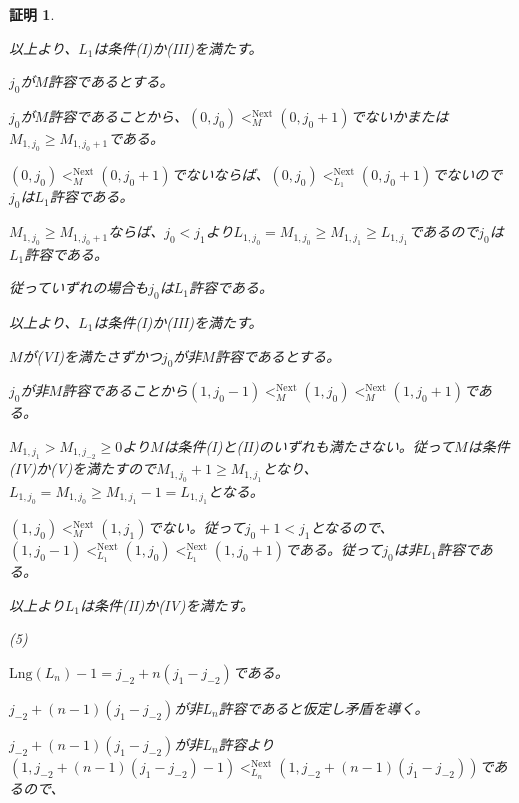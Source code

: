 \documentclass[dvipdfmx,uplatex]{jsarticle}
\theoremstyle{customnonumberbreakfortheorem}
\theoremstyle{customnonumberbreakforproof}
\newtheorem{hideableproof}{証明}
\newcommand{\qedhere}{\hfill\hideableproofSymbol}
\begin{document}
\begin{hideableproof}
\begin{indented}
\begin{indented}
			\item 以上より、\(L_1\)は条件(I)か(III)を満たす。
		\end{indented}
		\item \(j_0\)が\(M\)許容であるとする。
		\begin{indented}
			\item \(j_0\)が\(M\)許容であることから、\((0,j_0) <_M^{\textrm{Next}} (0,j_0+1)\)でないかまたは\(M_{1,j_0} \geq M_{1,j_0+1}\)である。
			\item \((0,j_0) <_M^{\textrm{Next}} (0,j_0+1)\)でないならば、\((0,j_0) <_{L_1}^{\textrm{Next}} (0,j_0+1)\)でないので\(j_0\)は\(L_1\)許容である。
			\item \(M_{1,j_0} \geq M_{1,j_0+1}\)ならば、\(j_0 < j_1\)より\(L_{1,j_0} = M_{1,j_0} \geq M_{1,j_1} \geq L_{1,j_1}\)であるので\(j_0\)は\(L_1\)許容である。
			\item 従っていずれの場合も\(j_0\)は\(L_1\)許容である。
			\item 以上より、\(L_1\)は条件(I)か(III)を満たす。
		\end{indented}
		\item \(M\)が(VI)を満たさずかつ\(j_0\)が非\(M\)許容であるとする。
		\begin{indented}
			\item \(j_0\)が非\(M\)許容であることから\((1,j_0-1) <_M^{\textrm{Next}} (1,j_0) <_M^{\textrm{Next}} (1,j_0+1)\)である。
			\item \(M_{1,j_1} > M_{1,j_{-2}} \geq 0\)より\(M\)は条件(I)と(II)のいずれも満たさない。従って\(M\)は条件(IV)か(V)を満たすので\(M_{1,j_0}+1 \geq M_{1,j_1}\)となり、\(L_{1,j_0} = M_{1,j_0} \geq M_{1,j_1}-1 = L_{1,j_1}\)となる。
			\item \((1,j_0) <_M^{\textrm{Next}} (1,j_1)\)でない。従って\(j_0+1 < j_1\)となるので、\((1,j_0-1) <_{L_1}^{\textrm{Next}} (1,j_0) <_{L_1}^{\textrm{Next}} (1,j_0+1)\)である。従って\(j_0\)は非\(L_1\)許容である。
			\item 以上より\(L_1\)は条件(II)か(IV)を満たす。\qedhere
		\end{indented}
		\item
		\item (5)
		\item \(\textrm{Lng}(L_n)-1 = j_{-2}+n(j_1-j_{-2})\)である。
		\item \(j_{-2}+(n-1)(j_1-j_{-2})\)が非\(L_n\)許容であると仮定し矛盾を導く。
		\begin{indented}
			\item \(j_{-2}+(n-1)(j_1-j_{-2})\)が非\(L_n\)許容より\((1,j_{-2}+(n-1)(j_1-j_{-2})-1) <_{L_n}^{\textrm{Next}} (1,j_{-2}+(n-1)(j_1-j_{-2}))\)であるので、

\end{indented}
\end{indented}
\end{hideableproof}
\end{document}
